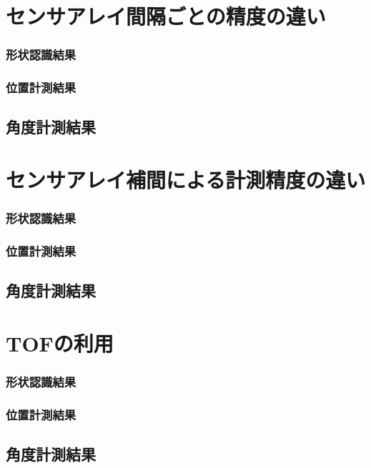 \section{センサアレイ間隔ごとの精度の違い}

\subsubsection{形状認識結果}

\subsubsection{位置計測結果}

\subsection{角度計測結果}


\section{センサアレイ補間による計測精度の違い}

\subsubsection{形状認識結果}

\subsubsection{位置計測結果}

\subsection{角度計測結果}


\section{TOFの利用}

\subsubsection{形状認識結果}

\subsubsection{位置計測結果}

\subsection{角度計測結果}

